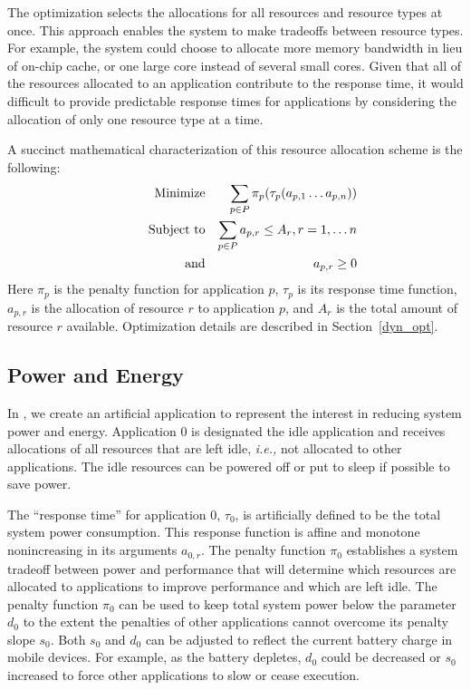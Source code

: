 The optimization selects the allocations for all resources and
resource types at once.  This approach enables the system to make
tradeoffs between resource types.  For example, the system could
choose to allocate more memory bandwidth in lieu of on-chip cache, or
one large core instead of several small cores.  Given that all of the
resources allocated to an application contribute to the response time,
it would difficult to provide predictable response times for
applications by considering the allocation of only one resource type at a
time.

A succinct mathematical characterization of this resource allocation scheme is the following:
\begin{eqnarray*}
& \makebox[1in][r]{Minimize}   & \sum_{p\in P} {\pi_p(\tau_p(a_{p,1}\ldots a_{p,n}))}  \\
& \makebox[1in][r]{Subject to} & \sum_{p\in P} a_{p,r} \leq A_r, r = 1,\ldots n        \\
& \makebox[1in][r]{and}        & a_{p,r} \geq 0
\end{eqnarray*}
Here $\pi_p$ is the penalty function for application $p$,
$\tau_p$ is its response time function,
$a_{p,r}$ is the allocation of resource $r$ to application $p$,
and $A_r$ is the total amount of resource $r$ available.  Optimization details are described in Section~\ref{dyn_opt}.

\subsection{Power and Energy}
In \pacora, we create an artificial application to represent the
interest in reducing system power and energy.  Application 0 is
designated the idle application and receives allocations of all
resources that are left idle, \emph{i.e.,} not allocated to other
applications.  The idle resources can be powered off or put to sleep
if possible to save power.

The ``response time'' for application 0, $\tau_0$, is artificially
defined to be the total system power consumption.
This response function is affine and monotone nonincreasing in its arguments $a_{0,r}$.
The penalty function $\pi_0$ establishes a system tradeoff between
power and performance that will determine which resources are
allocated to applications to improve performance and which are left
idle.  The penalty function $\pi_0$ can be used to keep total system
power below the parameter $d_0$ to the extent the penalties of other
applications cannot overcome its penalty slope $s_0$. Both $s_0$ and
$d_0$ can be adjusted to reflect the current battery charge in mobile
devices. For example, as the battery depletes, $d_0$ could be decreased or $s_0$ increased
to force other applications to slow or cease execution.

